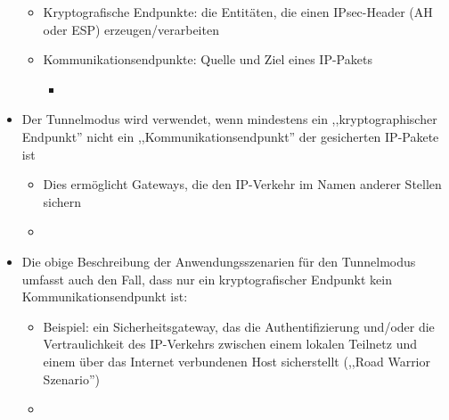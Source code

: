 \documentclass[a4paper]{article}
\begin{document}
\begin{multicols}{3}
\begin{itemize}
              \begin{itemize}
                  \item
                        Kryptografische Endpunkte: die Entitäten, die einen IPsec-Header (AH
                        oder ESP) erzeugen/verarbeiten
                  \item
                        Kommunikationsendpunkte: Quelle und Ziel eines IP-Pakets

                        \begin{itemize}
                            \item
                        \end{itemize}
              \end{itemize}
        \item
              Der Tunnelmodus wird verwendet, wenn mindestens ein
              ,,kryptographischer Endpunkt'' nicht ein ,,Kommunikationsendpunkt''
              der gesicherten IP-Pakete ist

              \begin{itemize}
                  \item
                        Dies ermöglicht Gateways, die den IP-Verkehr im Namen anderer
                        Stellen sichern
                  \item
              \end{itemize}
        \item
              Die obige Beschreibung der Anwendungsszenarien für den Tunnelmodus
              umfasst auch den Fall, dass nur ein kryptografischer Endpunkt kein
              Kommunikationsendpunkt ist:

              \begin{itemize}
                  \item
                        Beispiel: ein Sicherheitsgateway, das die Authentifizierung und/oder
                        die Vertraulichkeit des IP-Verkehrs zwischen einem lokalen Teilnetz
                        und einem über das Internet verbundenen Host sicherstellt (,,Road
                        Warrior Szenario'')
                  \item
              \end{itemize}
    \end{itemize}



\end{multicols}
\end{document}
